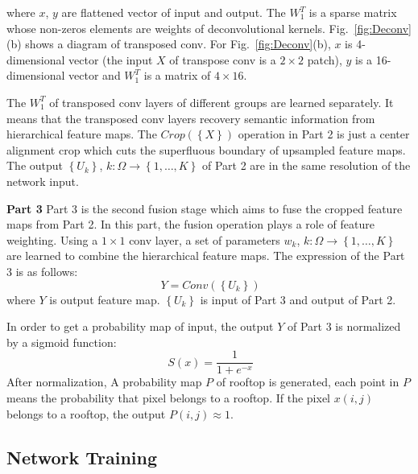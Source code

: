 where ${x}$, ${y}$ are flattened vector of input and output. The ${W_1^T}$ is a sparse matrix whose non-zeros elements are weights of deconvolutional kernels.
Fig.~\ref{fig:Deconv}(b) shows a diagram of transposed conv.
For Fig.~\ref{fig:Deconv}(b), ${x}$ is 4-dimensional vector (the input ${X}$ of transpose conv is a ${2\times2}$ patch), ${y}$ is a 16-dimensional vector and ${W_1^T}$ is a matrix of ${4\times16}$.

The ${W_1^T}$ of transposed conv layers of different groups are learned separately. It means that the transposed conv layers recovery semantic information from hierarchical feature maps.
The ${Crop(\left\{X \right\})}$ operation in Part 2 is just a center alignment crop which cuts the superfluous boundary of upsampled feature maps. The output ${\left\{U_k\right\}}$, ${k:\Omega \to\left\{1,\ldots,K\right\}}$ of Part 2 are in the same resolution of the network input.


\textbf{Part 3} Part 3 is the second fusion stage which aims to fuse the cropped feature maps from Part 2.
In this part, the fusion operation plays a role of feature weighting.
Using a ${1\times1}$ conv layer, a set of parameters ${w_k}$, ${k:\Omega \to\left\{1,\ldots,K\right\}}$ are learned to combine the hierarchical feature maps.
The expression of the Part 3 is as follows:
\begin{equation}
    \label{fature_selection}
    \ Y= Conv(\left\{U_k\right\})
\end{equation}
where ${Y}$ is output feature map. ${\left\{U_k\right\}}$ is input of Part 3 and output of Part 2.


In order to get a probability map of input, the output ${Y}$ of Part 3 is normalized by a sigmoid function:
\begin{equation}
    \label{Sigmoid}
    \ S(x) = \frac{1}{1+e^{-x}}
\end{equation}
After normalization, A probability map ${P}$ of rooftop is generated, each point in ${P}$ means the probability that pixel belongs to a rooftop.
If the pixel ${x(i,j)}$ belongs to a rooftop, the output ${P(i,j)\approx1}$.

\subsection{Network Training}

